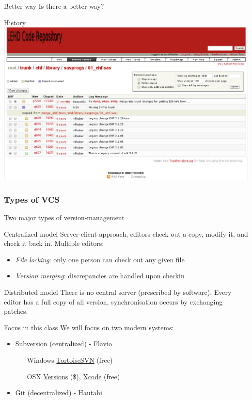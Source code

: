 \documentclass[xcolor=table,compress]{beamer}
\begin{document}
\begin{frame}{Better way}
Is there a better way?
\end{frame}


\begin{frame}{History}
\includegraphics[width=.9\textwidth]{trac-svn-view2.png}
\end{frame}


\subsubsection[Types]{Types of VCS}
\begin{frame}{Two major types of version-management}
\begin{block}{Centralized model}
Server-client approach, editors check out a copy, modify it, and check it back in. Multiple editors:
\begin{itemize}
\item \textit{File locking}: only one person can check out any given file
\item \textit{Version merging}: discrepancies are handled upon checkin
\end{itemize}
\end{block}
\pause
\begin{block}{Distributed model}
There is no central server (prescribed by software). Every editor has a full copy of all version, synchronisation occurs by exchanging patches.
\end{block}
\end{frame}


\begin{frame}{Focus in this class}
We will focus on two modern systems:
\begin{itemize}
\item Subversion (centralized) - Flavio 
\begin{itemize}
\item[Windows] \href{http://tortoisesvn.tigris.org/}{TortoiseSVN} (free)
\item[OSX] \href{http://versionsapp.com/}{Versions} (\$), \href{http://developer.apple.com/xcode/}{Xcode} (free)
\end{itemize}
\item Git (decentralized) - Hautahi
\end{itemize}
\end{frame}
\end{document}

